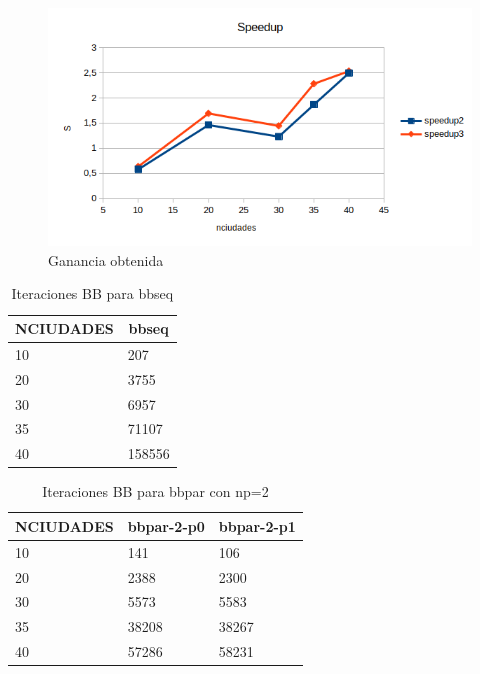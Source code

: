 \begin{figure}[H]
\centering
\includegraphics[width=\textwidth]{imagenes/speedup2.png}
\caption{Ganancia obtenida}
\end{figure}

\begin{table}[H]
\centering
\begin{tabular}{|l|l|}
\hline
\multicolumn{1}{|c|}{\textbf{NCIUDADES}} & \multicolumn{1}{c|}{\textbf{bbseq}} \\ \hline
10                                       & 207                                 \\ \hline
20                                       & 3755                                \\ \hline
30                                       & 6957                                \\ \hline
35                                       & 71107                               \\ \hline
40                                       & 158556                              \\ \hline
\end{tabular}
\caption{Iteraciones BB para bbseq}
\end{table}

\begin{table}[H]
\centering
\begin{tabular}{|l|l|l|}
\hline
\textbf{NCIUDADES} & \textbf{bbpar-2-p0} & \multicolumn{1}{c|}{\textbf{bbpar-2-p1}} \\ \hline
10                 & 141                 & 106                                      \\ \hline
20                 & 2388                & 2300                                     \\ \hline
30                 & 5573                & 5583                                     \\ \hline
35                 & 38208               & 38267                                    \\ \hline
40                 & 57286               & 58231                                    \\ \hline
\end{tabular}
\caption{Iteraciones BB para bbpar con np=2}
\end{table}

